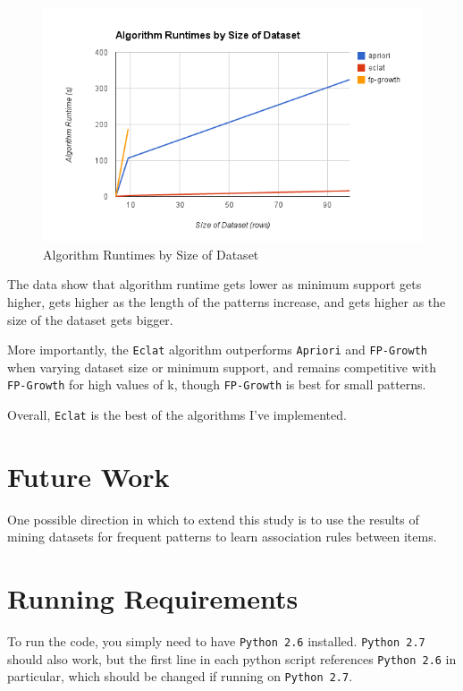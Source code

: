 \documentclass[11pt]{article}
\begin{document}
\begin{multicols}{2}
\begin{center}
\begin{figure}
\includegraphics[scale=0.9]{../figs/runtimes_by_rows.png}
\caption{Algorithm Runtimes by Size of Dataset}
\end{figure}
\end{center}

The data show that algorithm runtime gets lower as minimum support gets
higher, gets higher as the length of the patterns increase, and gets
higher as the size of the dataset gets bigger.

More importantly, the \texttt{Eclat} algorithm outperforms
\texttt{Apriori} and \texttt{FP-Growth} when varying dataset size or
minimum support, and remains competitive with \texttt{FP-Growth} for
high values of k, though \texttt{FP-Growth} is best for small
patterns.

Overall, \texttt{Eclat} is the best of the algorithms I've
implemented.

\section{Future Work}

One possible direction in which to extend this study is to use the
results of mining datasets for frequent patterns to learn association
rules between items. \cite{wiki_arl}

\appendix
\section{Running Requirements}

To run the code, you simply need to have \texttt{Python 2.6}
installed.  \texttt{Python 2.7} should also work, but the first line
in each python script references \texttt{Python 2.6} in particular,
which should be changed if running on \texttt{Python 2.7}.


\end{multicols}
\end{document}
